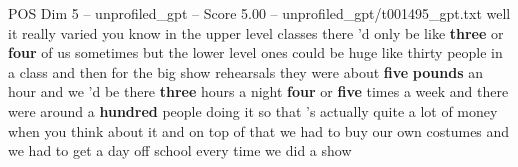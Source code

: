 \begin{textsample}{POS Dim 5 – unprofiled\_gpt – Score 5.00 – unprofiled\_gpt/t001495\_gpt.txt}  \label{ex:f5_pos_033}
well it really varied you know in the upper level classes there ’d only be like \textbf{three} or \textbf{four} of us sometimes but the lower level ones could be huge like thirty people in a class and then for the big show rehearsals they were about \textbf{five} \textbf{pounds} an hour and we ’d be there \textbf{three} hours a night \textbf{four} or \textbf{five} times a week and there were around a \textbf{hundred} people doing it so that ’s actually quite a lot of money when you think about it and on top of that we had to buy our own costumes and we had to get a day off school every time we did a show

\end{textsample}
